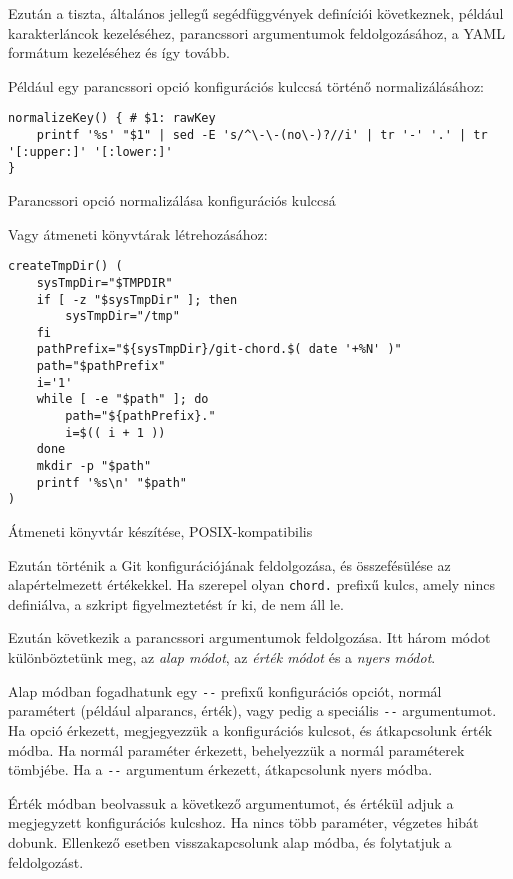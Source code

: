 \documentclass[
]{elteikthesis}[2025/03/25]
\begin{document}
Ezután a tiszta, általános jellegű segédfüggvények definíciói következnek,
például karakterláncok kezeléséhez,
parancssori argumentumok feldolgozásához,
a YAML formátum kezeléséhez
és így tovább.

Például egy parancssori opció konfigurációs kulccsá történő normalizálásához:

\begin{listing}[H]
\begin{verbatim}
normalizeKey() { # $1: rawKey
    printf '%s' "$1" | sed -E 's/^\-\-(no\-)?//i' | tr '-' '.' | tr '[:upper:]' '[:lower:]'
}
\end{verbatim}
\caption{Parancssori opció normalizálása konfigurációs kulccsá}
\end{listing}

Vagy átmeneti könyvtárak létrehozásához:

\begin{listing}[H]
\begin{verbatim}
createTmpDir() (
    sysTmpDir="$TMPDIR"
    if [ -z "$sysTmpDir" ]; then
        sysTmpDir="/tmp"
    fi
    pathPrefix="${sysTmpDir}/git-chord.$( date '+%N' )"
    path="$pathPrefix"
    i='1'
    while [ -e "$path" ]; do
        path="${pathPrefix}."
        i=$(( i + 1 ))
    done
    mkdir -p "$path"
    printf '%s\n' "$path"
)
\end{verbatim}
\caption{Átmeneti könyvtár készítése, POSIX-kompatibilis}
\end{listing}

Ezután történik a Git konfigurációjának feldolgozása, és összefésülése az alapértelmezett értékekkel.
Ha szerepel olyan \verb|chord.| prefixű kulcs, amely nincs definiálva,
a szkript figyelmeztetést ír ki, de nem áll le.

Ezután következik a parancssori argumentumok feldolgozása.
Itt három módot különböztetünk meg, az \textit{alap módot}, az \textit{érték módot} és a \textit{nyers módot}.

Alap módban fogadhatunk egy \verb|--| prefixű konfigurációs opciót, normál paramétert (például alparancs, érték), vagy pedig a speciális \verb|--| argumentumot.
Ha opció érkezett, megjegyezzük a konfigurációs kulcsot, és átkapcsolunk érték módba.
Ha normál paraméter érkezett, behelyezzük a normál paraméterek tömbjébe.
Ha a \verb|--| argumentum érkezett, átkapcsolunk nyers módba.

Érték módban beolvassuk a következő argumentumot, és értékül adjuk a megjegyzett konfigurációs kulcshoz.
Ha nincs több paraméter, végzetes hibát dobunk.
Ellenkező esetben visszakapcsolunk alap módba, és folytatjuk a feldolgozást.
\end{document}
